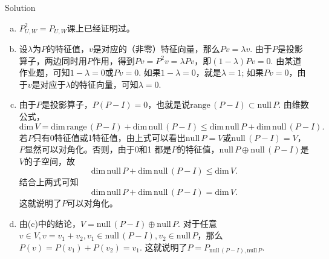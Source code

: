 \documentclass[12pt]{article}
\begin{document}
\noindent{} Solution
\begin{enumerate}[(a)]
\item $P_{U,W}^2 = P_{U,W}$课上已经证明过。

\item 设$\lambda$为$P$的特征值，$v$是对应的（非零）特征向量，那么$Pv=\lambda v$. 由于$P$是投影算子，两边同时用$P$作用，得到$Pv = P^2v=\lambda Pv$，即$(1-\lambda) Pv=0$. 由某道作业题，可知$1-\lambda=0$或$Pv=0$. 如果$1-\lambda=0$，就是$\lambda=1$; 如果$Pv=0$，由于$v$是对应于$\lambda$的特征向量，可知$\lambda=0$.

\item 由于$P$是投影算子，$P(P-I)=0$，也就是说$\mathrm{range}\, (P-I) \subset \mathrm{null}\, P$. 由维数公式，
\[\mathrm{dim}\, V = \mathrm{dim}\, \mathrm{range}\,(P-I)+\mathrm{dim}\,\mathrm{null}\,(P-I)\le \mathrm{dim}\, \mathrm{null}\,P+\mathrm{dim}\,\mathrm{null}\,(P-I).\]
若$P$只有0特征值或1特征值，由上式可以看出$\mathrm{null}\,P=V$或$\mathrm{null}\,(P-I)=V$，$P$显然可以对角化。否则，由于0和1 都是$P$的特征值，$\mathrm{null}\,P \oplus \mathrm{null}\,(P-I)$是$V$的子空间，故
\[\mathrm{dim}\, \mathrm{null}\,P+\mathrm{dim}\,\mathrm{null}\,(P-I)\le\mathrm{dim}\, V.\]
结合上两式可知
\[\mathrm{dim}\, \mathrm{null}\,P+\mathrm{dim}\,\mathrm{null}\,(P-I)=\mathrm{dim}\, V.\]
这就说明了$P$可以对角化。

\item 由(c)中的结论，$V =  \mathrm{null}\,(P-I)\oplus  \mathrm{null}\,P$. 对于任意$v\in V, v= v_1+v_2, v_1\in  \mathrm{null}\,(P-I), v_2 \in  \mathrm{null}\,P$，那么$P(v)=P(v_1)+P(v_2)=v_1$. 这就说明了$P = P_{ \mathrm{null}\,(P-I), \mathrm{null}\,P}$.
\end{enumerate}
\end{document}

